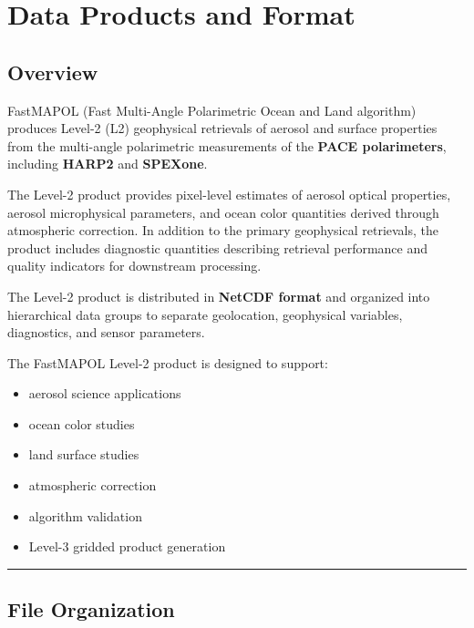 \documentclass[
  11pt,
  letterpaper,
]{scrreprt}
\providecommand{\tightlist}{%
  \setlength{\itemsep}{0pt}\setlength{\parskip}{0pt}}
\begin{document}

\chapter{Data Products and Format}\label{sec-data-format}

\section{Overview}\label{overview}

FastMAPOL (Fast Multi-Angle Polarimetric Ocean and Land algorithm)
produces Level-2 (L2) geophysical retrievals of aerosol and surface
properties from the multi-angle polarimetric measurements of the
\textbf{PACE polarimeters}, including \textbf{HARP2} and
\textbf{SPEXone}.

The Level-2 product provides pixel-level estimates of aerosol optical
properties, aerosol microphysical parameters, and ocean color quantities
derived through atmospheric correction. In addition to the primary
geophysical retrievals, the product includes diagnostic quantities
describing retrieval performance and quality indicators for downstream
processing.

The Level-2 product is distributed in \textbf{NetCDF format} and
organized into hierarchical data groups to separate geolocation,
geophysical variables, diagnostics, and sensor parameters.

The FastMAPOL Level-2 product is designed to support:

\begin{itemize}
\tightlist
\item
  aerosol science applications
\item
  ocean color studies
\item
  land surface studies
\item
  atmospheric correction
\item
  algorithm validation
\item
  Level-3 gridded product generation
\end{itemize}

\begin{center}\rule{0.5\linewidth}{0.5pt}\end{center}

\section{File Organization}\label{file-organization}
\end{document}
